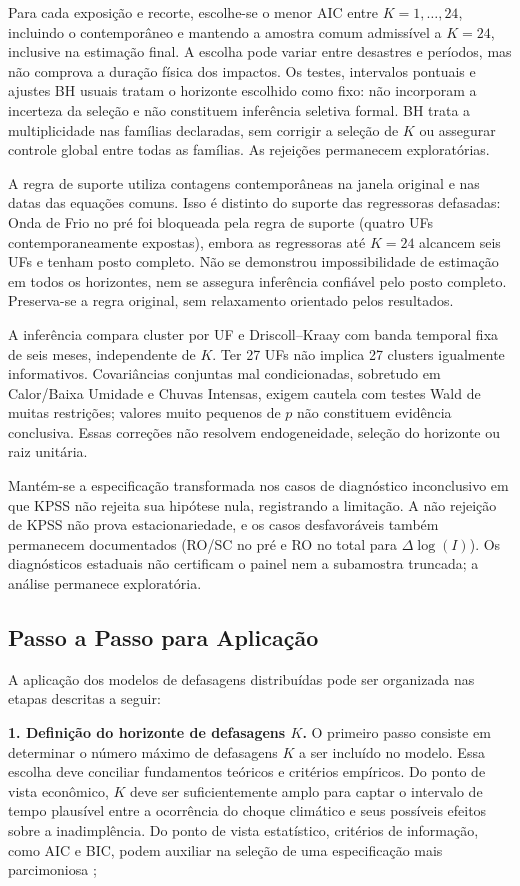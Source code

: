 Para cada exposição e recorte, escolhe-se o menor AIC entre $K=1,\ldots,24$, incluindo o contemporâneo e mantendo a amostra comum admissível a $K=24$, inclusive na estimação final. A escolha pode variar entre desastres e períodos, mas não comprova a duração física dos impactos. Os testes, intervalos pontuais e ajustes BH usuais tratam o horizonte escolhido como fixo: não incorporam a incerteza da seleção e não constituem inferência seletiva formal. BH trata a multiplicidade nas famílias declaradas, sem corrigir a seleção de $K$ ou assegurar controle global entre todas as famílias. As rejeições permanecem exploratórias.

A regra de suporte utiliza contagens contemporâneas na janela original e nas datas das equações comuns. Isso é distinto do suporte das regressoras defasadas: Onda de Frio no pré foi bloqueada pela regra de suporte (quatro UFs contemporaneamente expostas), embora as regressoras até $K=24$ alcancem seis UFs e tenham posto completo. Não se demonstrou impossibilidade de estimação em todos os horizontes, nem se assegura inferência confiável pelo posto completo. Preserva-se a regra original, sem relaxamento orientado pelos resultados.

A inferência compara cluster por UF e Driscoll--Kraay com banda temporal fixa de seis meses, independente de $K$. Ter 27 UFs não implica 27 clusters igualmente informativos. Covariâncias conjuntas mal condicionadas, sobretudo em Calor/Baixa Umidade e Chuvas Intensas, exigem cautela com testes Wald de muitas restrições; valores muito pequenos de $p$ não constituem evidência conclusiva. Essas correções não resolvem endogeneidade, seleção do horizonte ou raiz unitária.

Mantém-se a especificação transformada nos casos de diagnóstico inconclusivo em que KPSS não rejeita sua hipótese nula, registrando a limitação. A não rejeição de KPSS não prova estacionariedade, e os casos desfavoráveis também permanecem documentados (RO/SC no pré e RO no total para $\Delta\log(I)$). Os diagnósticos estaduais não certificam o painel nem a subamostra truncada; a análise permanece exploratória.

\subsection{Passo a Passo para Aplicação}

A aplicação dos modelos de defasagens distribuídas pode ser organizada nas etapas
descritas a seguir:

\textbf{1. Definição do horizonte de defasagens $K$.} O primeiro passo consiste em
determinar o número máximo de defasagens $K$ a ser incluído no modelo. Essa escolha
deve conciliar fundamentos teóricos e critérios empíricos. Do ponto de vista
econômico, $K$ deve ser suficientemente amplo para captar o intervalo de tempo
plausível entre a ocorrência do choque climático e seus possíveis efeitos sobre a
inadimplência. Do ponto de vista estatístico, critérios de informação, como AIC e
BIC, podem auxiliar na seleção de uma especificação mais parcimoniosa
\citep{wooldridge2010};

